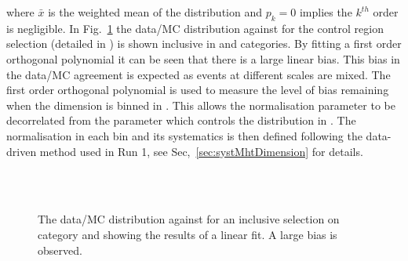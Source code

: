 where $\bar{x}$ is the weighted mean of the distribution and $p_k = 0$ 
implies the $k^{th}$ order is negligible.
In Fig.~\ref{fig:linearMotiv} the data/MC 
distribution against \mht for the control region selection 
(detailed in \cite{CMS_AN_2013-366}) is shown inclusive 
in \scalht and categories. By fitting a first order
orthogonal polynomial it can be seen that there is a large linear bias. 
This bias in the data/MC agreement is expected as events 
at different scales are mixed.
The first order orthogonal polynomial
is used to measure the level of bias remaining 
when the \mht dimension is binned in \scalht.
This allows the normalisation parameter to be
decorrelated from the parameter which controls
the distribution in \mht.
The normalisation in each \scalht bin and its systematics 
is then defined following the data-driven method used in Run 1, see Sec,~\ref{sec:systMhtDimension} for details.
\begin{figure}[h!]
  \centering
  ~~
  \\
  ~~
  \\
  \caption{\label{fig:linearMotiv} 
  The data/MC distribution against \mht for an inclusive selection on category and \scalht
  showing the results of a linear fit. A large bias is observed. 
 }
\end{figure}

